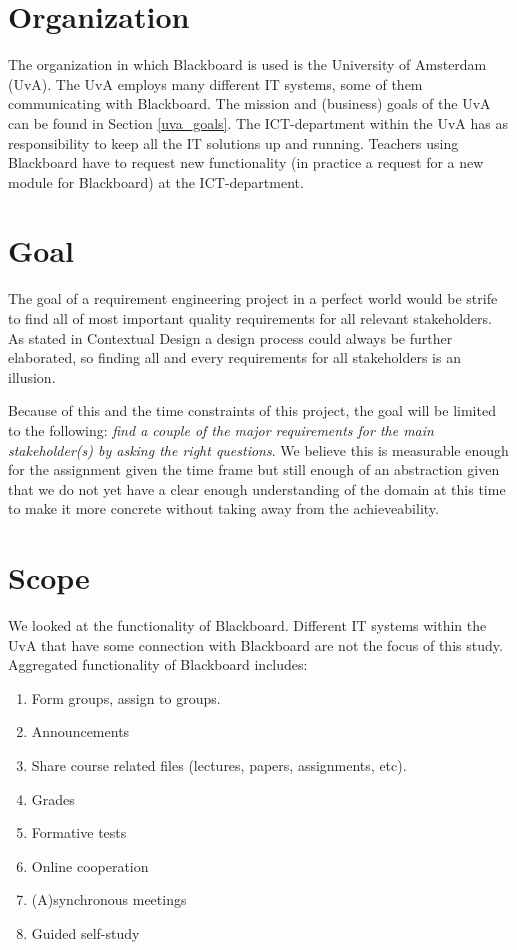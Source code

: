 \section{Organization}
The organization in which Blackboard is used is the University of Amsterdam (UvA). The UvA employs many different IT systems, some of them communicating with Blackboard. The mission and (business) goals of the UvA can be found in Section \ref{uva_goals}. The ICT-department within the UvA has as responsibility to keep all the IT solutions up and running. Teachers using Blackboard have to request new functionality (in practice a request for a new module for Blackboard) at the ICT-department. 


\section{Goal}
The goal of a requirement engineering project in a perfect world would be strife to find all of most important quality requirements for all relevant stakeholders. As stated in Contextual Design \cite{contextual_design} a design process could always be further elaborated, so finding all and every requirements for all stakeholders is an illusion.

Because of this and the time constraints of this project, the goal will be limited to the following: \emph{find a couple of the major requirements for the main stakeholder(s) by asking the right questions}. We believe this is measurable enough for the assignment given the time frame but still enough of an abstraction given that we do not yet have a clear enough understanding of the domain at this time to make it more concrete without taking away from the achieveability.

\section{Scope}
We looked at the functionality of Blackboard. Different IT systems within the UvA that have some connection with Blackboard are not the focus of this study. Aggregated functionality of Blackboard includes:
\begin{enumerate}
	\item Form groups, assign to groups.
	\item Announcements
	\item Share course related files (lectures, papers, assignments, etc).
	\item Grades
	\item Formative tests
	\item Online cooperation
	\item (A)synchronous meetings
	\item Guided self-study
\end{enumerate}


